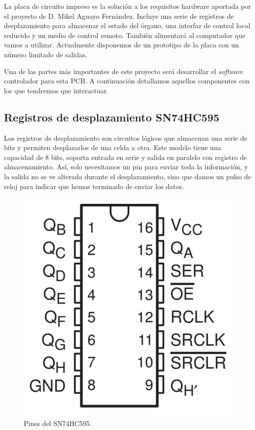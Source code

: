 La placa de circuito impreso es la solución a los requisitos hardware aportada por el proyecto de D. Mikel Aguayo Fernández. Incluye una serie de registros de desplazamiento para almacenar el estado del órgano, una interfaz de control local reducido y un medio de control remoto. También alimentará al computador que vamos a utilizar. Actualmente disponemos de un prototipo de la placa con un número limitado de salidas.

Una de las partes más importantes de este proyecto será desarrollar el \textit{software} controlador para esta PCB. A continuación detallamos aquellos componentes con los que tendremos que interactuar.

\subsection{Registros de desplazamiento SN74HC595}

Los registros de desplazamiento son circuitos lógicos que almacenan una serie de bits y permiten desplazarlos de una celda a otra. Este modelo tiene una capacidad de 8 bits, soporta entrada en serie y salida en paralelo con registro de almacenamiento. Así, solo necesitamos un pin para enviar toda la información, y la salida no se ve alterada durante el desplazamiento, sino que damos un pulso de reloj para indicar que hemos terminado de enviar los datos.

\smallskip

\begin{figure}[H]
	\noindent \begin{centering}
		\includegraphics[width=\linewidth/4]{capitulo3/SN74HC595}
		\par\end{centering}
	\smallskip
	\caption{\label{fig:SN74HC595} Pines del SN74HC595.}
\end{figure} 

